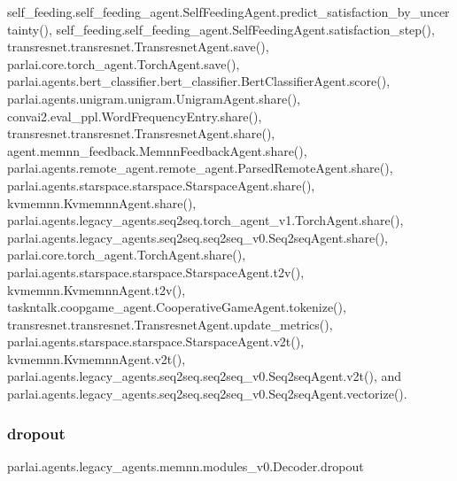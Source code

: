 self\+\_\+feeding.\+self\+\_\+feeding\+\_\+agent.\+Self\+Feeding\+Agent.\+predict\+\_\+satisfaction\+\_\+by\+\_\+uncertainty(), self\+\_\+feeding.\+self\+\_\+feeding\+\_\+agent.\+Self\+Feeding\+Agent.\+satisfaction\+\_\+step(), transresnet.\+transresnet.\+Transresnet\+Agent.\+save(), parlai.\+core.\+torch\+\_\+agent.\+Torch\+Agent.\+save(), parlai.\+agents.\+bert\+\_\+classifier.\+bert\+\_\+classifier.\+Bert\+Classifier\+Agent.\+score(), parlai.\+agents.\+unigram.\+unigram.\+Unigram\+Agent.\+share(), convai2.\+eval\+\_\+ppl.\+Word\+Frequency\+Entry.\+share(), transresnet.\+transresnet.\+Transresnet\+Agent.\+share(), agent.\+memnn\+\_\+feedback.\+Memnn\+Feedback\+Agent.\+share(), parlai.\+agents.\+remote\+\_\+agent.\+remote\+\_\+agent.\+Parsed\+Remote\+Agent.\+share(), parlai.\+agents.\+starspace.\+starspace.\+Starspace\+Agent.\+share(), kvmemnn.\+Kvmemnn\+Agent.\+share(), parlai.\+agents.\+legacy\+\_\+agents.\+seq2seq.\+torch\+\_\+agent\+\_\+v1.\+Torch\+Agent.\+share(), parlai.\+agents.\+legacy\+\_\+agents.\+seq2seq.\+seq2seq\+\_\+v0.\+Seq2seq\+Agent.\+share(), parlai.\+core.\+torch\+\_\+agent.\+Torch\+Agent.\+share(), parlai.\+agents.\+starspace.\+starspace.\+Starspace\+Agent.\+t2v(), kvmemnn.\+Kvmemnn\+Agent.\+t2v(), taskntalk.\+coopgame\+\_\+agent.\+Cooperative\+Game\+Agent.\+tokenize(), transresnet.\+transresnet.\+Transresnet\+Agent.\+update\+\_\+metrics(), parlai.\+agents.\+starspace.\+starspace.\+Starspace\+Agent.\+v2t(), kvmemnn.\+Kvmemnn\+Agent.\+v2t(), parlai.\+agents.\+legacy\+\_\+agents.\+seq2seq.\+seq2seq\+\_\+v0.\+Seq2seq\+Agent.\+v2t(), and parlai.\+agents.\+legacy\+\_\+agents.\+seq2seq.\+seq2seq\+\_\+v0.\+Seq2seq\+Agent.\+vectorize().

\mbox{\label{classparlai_1_1agents_1_1legacy__agents_1_1memnn_1_1modules__v0_1_1Decoder_a0116a3c2b822fd074e7f67efc3609b69}} 
\subsubsection{\texorpdfstring{dropout}{dropout}}
{\footnotesize\ttfamily parlai.\+agents.\+legacy\+\_\+agents.\+memnn.\+modules\+\_\+v0.\+Decoder.\+dropout}



